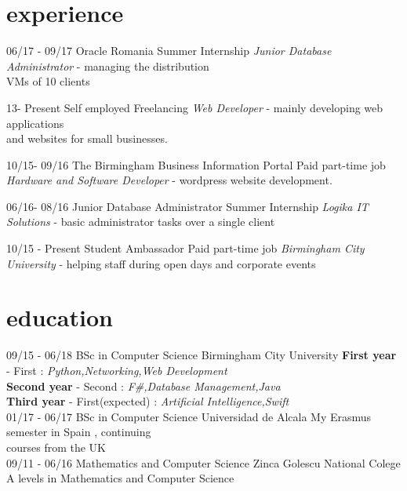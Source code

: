 \documentclass[]{friggeri-cv}
\begin{document}
\section{experience}
\begin{entrylist}
    \entry
  {06/17 - 09/17}
  {Oracle Romania}
  {Summer Internship}
  {\emph{Junior Database Administrator} - managing the distribution \\VMs of 10 clients}
 
  \entry
  {13- Present}
  {Self employed}
  {Freelancing}
  {\emph{Web Developer} - mainly developing web applications \\and websites for small businesses.}
 
  \entry
  {10/15- 09/16}
  {The Birmingham Business Information Portal}
  {Paid part-time job}
  {\emph{Hardware and Software Developer} - wordpress website development.}
  
  \entry
  {06/16- 08/16}
  {Junior Database Administrator}
  {Summer Internship}
  {\emph{Logika IT Solutions} - basic administrator tasks over a single client}
  
  \entry
  {10/15 - Present}
  {Student Ambassador}
  {Paid part-time job}
  {\emph{Birmingham City University} - helping staff during open days and corporate events }
  
\end{entrylist}


\section{education}
\begin{entrylist}
  \entry
  {09/15 - 06/18}
  {BSc in Computer Science}
  {Birmingham City University}
  {
    \textbf{First year }- First : \emph{Python,Networking,Web Development} \\
    \textbf{Second year } - Second : \emph{F\#,Database Management,Java} \\ 
    \textbf{Third year }- First(expected) : \emph{Artificial Intelligence,Swift}
  }
  \\
  \entry
  {01/17 - 06/17}
  {BSc in Computer Science }
  {Universidad de Alcala}
  {My Erasmus semester in Spain , continuing \\courses from the UK
  }
  \\
  \entry
  {09/11 - 06/16}
  {Mathematics and Computer Science}
  {Zinca Golescu National Colege}
  {A levels in Mathematics and Computer Science}

  \end{entrylist}
  
\end{document}
